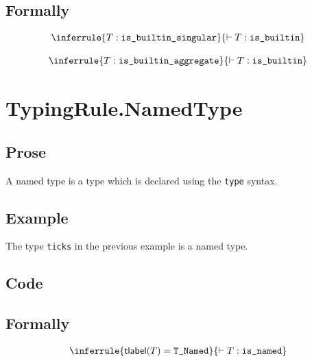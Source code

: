 \documentclass{book}
\newcommand\typelabel[0]{\textsf{tlabel}} %
\newcommand\isbuiltinsingular[0]{\texttt{is\_builtin\_singular}}
\newcommand\isbuiltinaggregate[0]{\texttt{is\_builtin\_aggregate}}
\newcommand\isbuiltin[0]{\texttt{is\_builtin}}
\newcommand\isnamed[0]{\texttt{is\_named}}
\begin{document}
\begin{formal}
      \subsection{Formally}
\[
\begin{array}{c}
\inferrule{T : \isbuiltinsingular}{\entails T : \isbuiltin}\\
\\
\inferrule{T : \isbuiltinaggregate}{\entails T : \isbuiltin}\\
\end{array}
\]
\end{formal}

	   
\section{TypingRule.NamedType \label{sec:TypingRule.NamedType} } 

    \subsection{Prose}
    A named type is a type which is declared using the \texttt{type} syntax.

    \subsection{Example}
    The type \texttt{ticks} in the previous example is a named type.

    \subsection{Code}

\begin{formal}
      \subsection{Formally}
\[
\begin{array}{c}
\inferrule{\typelabel(T) = \TNamed}{\entails T : \isnamed}
\end{array}
\]
\end{formal}
\end{document}
